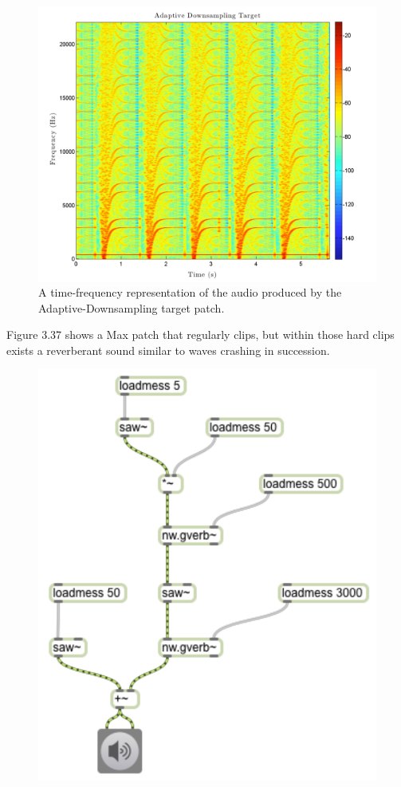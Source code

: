 \documentclass[a4paper,12pt]{report} 	%
\numberwithin{figure}{chapter}
\numberwithin{table}{chapter}
\numberwithin{equation}{chapter}
\begin{document}
\begin{flushleft}
\begin{figure}[h!]
\begin{center}
\includegraphics[scale=0.35,width=\linewidth]{AdaptiveDownsamplingTarget}
\caption[Adaptive Downsampling Time-Frequency Representation]{A time-frequency representation of the audio produced by the Adaptive-Downsampling target patch.}
\end{center}
\end{figure}
Figure 3.37 shows a Max patch that regularly clips, but within those hard clips exists a reverberant sound similar to waves crashing in succession. 
\begin{figure}[h!]
\begin{center}
\includegraphics[scale=0.8]{ClippingReverbSaw}

\end{center}
\end{figure}
\end{flushleft}
\end{document}
